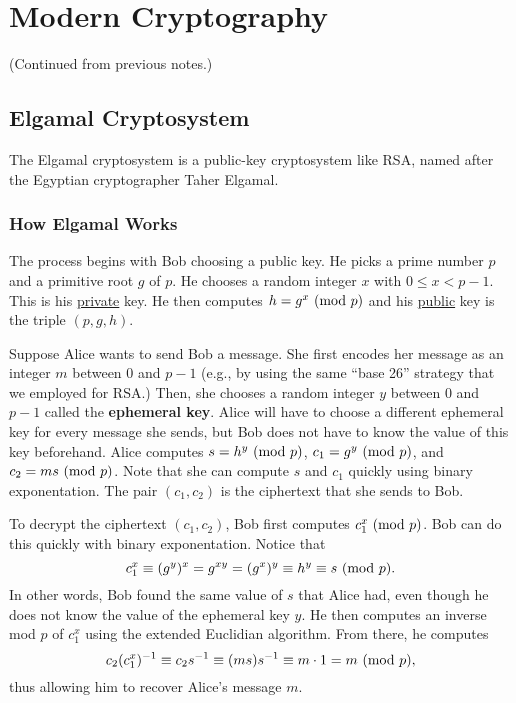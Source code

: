 \documentclass[letterpaper]{article}
\begin{document}
\section{Modern Cryptography}
(Continued from previous notes.)

\subsection{Elgamal Cryptosystem}
The Elgamal cryptosystem is a public-key cryptosystem like RSA, named after the Egyptian cryptographer Taher Elgamal.

\subsubsection{How Elgamal Works}
The process begins with Bob choosing a public key. He picks a prime number $p$ and a primitive root $g$ of $p$. He chooses a random integer $x$ with $0 \leq x < p - 1$. This is his \underline{private} key. He then computes $h = g^x \ (\mathrm{mod}\ p)$ and his \underline{public} key is the triple $(p, g, h)$. 

\bigskip 

Suppose Alice wants to send Bob a message. She first encodes her message as an integer $m$ between $0$ and $p - 1$ (e.g., by using the same ``base 26'' strategy that we employed for RSA.) Then, she chooses a random integer $y$ between $0$ and $p - 1$ called the \textbf{ephemeral key}. Alice will have to choose a different ephemeral key for every message she sends, but Bob does not have to know the value of this key beforehand. Alice computes $s = h^y \ (\mathrm{mod}\ p)$, $c_1 = g^y \ (\mathrm{mod}\ p)$, and $c_2 = ms \ (\mathrm{mod}\ p)$. Note that she can compute $s$ and $c_1$ quickly using binary exponentation. The pair $(c_1, c_2)$ is the ciphertext that she sends to Bob. 

\bigskip 

To decrypt the ciphertext $(c_1, c_2)$, Bob first computes $c_1^x \ (\mathrm{mod}\ p)$. Bob can do this quickly with binary exponentation. Notice that 
\[c_1^x \equiv (g^y)^x = g^{xy} = (g^x)^y \equiv h^y \equiv s \ (\mathrm{mod}\ p).\]
In other words, Bob found the same value of $s$ that Alice had, even though he does not know the value of the ephemeral key $y$. He then computes an inverse mod $p$ of $c_1^x$ using the extended Euclidian algorithm. From there, he computes 
\[c_2 (c_1^x)^{-1} \equiv c_2 s^{-1} \equiv (ms)s^{-1} \equiv m \cdot 1 = m \ (\mathrm{mod}\ p),\]
thus allowing him to recover Alice's message $m$.
\end{document}
